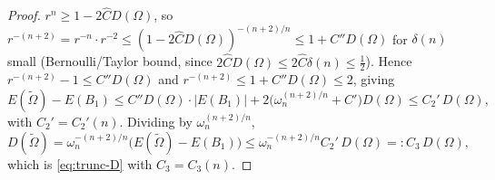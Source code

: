 \documentclass[11pt]{amsart}
\theoremstyle{definition}
\newcommand{\Om}{\Omega}
\newcommand{\abs}[1]{\left|#1\right|}
\newcommand{\Otilde}{\widetilde{\Omega}}
\begin{document}
\begin{proof}
$r^{n}\ge1-2\widehat C D(\Om)$, so
$r^{-(n+2)}=r^{-n}\cdot r^{-2}\le(1-2\widehat C D(\Om))^{-(n+2)/n}
\le1+C''D(\Om)$ for $\delta(n)$ small (Bernoulli/Taylor bound, since
$2\widehat C D(\Om)\le2\widehat C\delta(n)\le\tfrac12$). Hence
$r^{-(n+2)}-1\le C''D(\Om)$ and $r^{-(n+2)}\le1+C''D(\Om)\le2$, giving
\[
   E(\Otilde)-E(B_1)
   \le C''D(\Om)\cdot\abs{E(B_1)}+2\bigl(\omega_n^{(n+2)/n}+C'\bigr)D(\Om)
   \le C_2'\,D(\Om),
\]
with $C_2'=C_2'(n)$.
Dividing by $\omega_n^{(n+2)/n}$,
\begin{equation}\label{eq:D-tilde}
   D(\Otilde)=\omega_n^{-(n+2)/n}\bigl(E(\Otilde)-E(B_1)\bigr)
   \le\omega_n^{-(n+2)/n}C_2'\,D(\Om)=:C_3\,D(\Om),
\end{equation}
which is \eqref{eq:trunc-D} with $C_3=C_3(n)$.


\end{proof}
\end{document}
